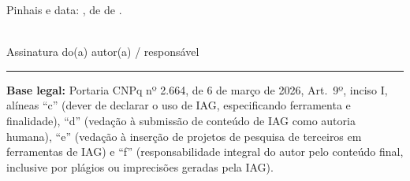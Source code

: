 \bigskip
\noindent
Pinhais e data: \underline{\hspace{4cm}}, \underline{\hspace{1.5cm}} de
\underline{\hspace{3cm}} de \underline{\hspace{1.5cm}}.

\bigskip\bigskip
\noindent
\underline{\hspace{7cm}}\\
Assinatura do(a) autor(a) / responsável

\bigskip
\noindent\rule{\textwidth}{0.4pt}
\footnotesize
\noindent
\textbf{Base legal:} Portaria CNPq nº 2.664, de 6 de março de 2026, Art.~9º, inciso I,
alíneas ``c'' (dever de declarar o uso de IAG, especificando ferramenta e finalidade),
``d'' (vedação à submissão de conteúdo de IAG como autoria humana), ``e'' (vedação à
inserção de projetos de pesquisa de terceiros em ferramentas de IAG) e ``f''
(responsabilidade integral do autor pelo conteúdo final, inclusive por plágios ou
imprecisões geradas pela IAG).
\normalsize
